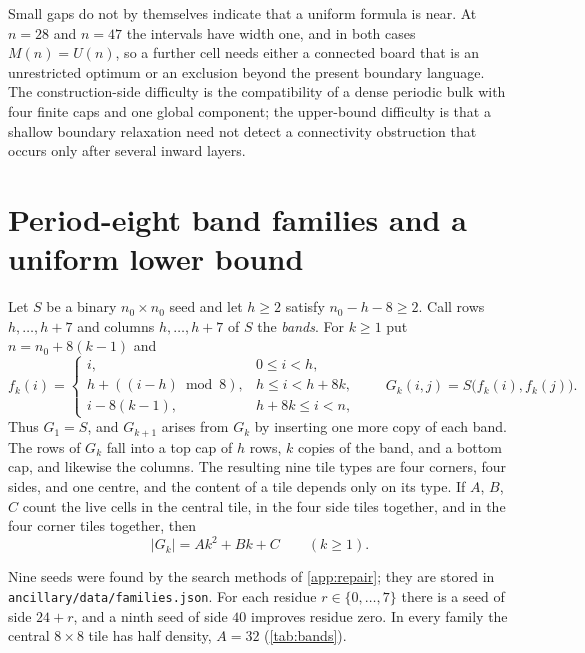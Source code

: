 \documentclass[10pt]{article}
\theoremstyle{remark}
\begin{document}
Small gaps do not by themselves indicate that a uniform formula is near.  At
$n=28$ and $n=47$ the intervals have width one, and in both cases
$M(n)=U(n)$, so a further cell needs either a connected board that is an
unrestricted optimum or an exclusion beyond the present boundary language.  The
construction-side difficulty is the compatibility of a dense periodic bulk with
four finite caps and one global component; the upper-bound difficulty is that a
shallow boundary relaxation need not detect a connectivity obstruction that
occurs only after several inward layers.

\section{Period-eight band families and a uniform lower bound}\label{sec:bands}

Let $S$ be a binary $n_0\times n_0$ seed and let $h\ge2$ satisfy $n_0-h-8\ge2$.
Call rows $h,\ldots,h+7$ and columns $h,\ldots,h+7$ of $S$ the \emph{bands}.  For
$k\ge1$ put $n=n_0+8(k-1)$ and
\begin{equation}\label{eq:band-index}
 f_k(i)=
 \begin{cases}
 i,&0\le i<h,\\
 h+((i-h)\bmod8),&h\le i<h+8k,\\
 i-8(k-1),&h+8k\le i<n,
 \end{cases}
 \qquad
 G_k(i,j)=S\bigl(f_k(i),f_k(j)\bigr).
\end{equation}
Thus $G_1=S$, and $G_{k+1}$ arises from $G_k$ by inserting one more copy of
each band.  The rows of $G_k$ fall into a top cap of $h$ rows, $k$ copies of the
band, and a bottom cap, and likewise the columns.  The resulting nine tile types
are four corners, four sides, and one centre, and the content of a tile depends
only on its type.  If $A$, $B$, $C$ count the live cells in the central tile, in
the four side tiles together, and in the four corner tiles together, then
\begin{equation}\label{eq:band-pop}
 |G_k|=Ak^2+Bk+C\qquad(k\ge1).
\end{equation}

Nine seeds were found by the search methods of \cref{app:repair}; they are
stored in \nolinkurl{ancillary/data/families.json}.  For each residue
$r\in\{0,\ldots,7\}$ there is a seed of side $24+r$, and a ninth seed of side
$40$ improves residue zero.  In every family the central $8\times8$ tile has
half density, $A=32$ (\cref{tab:bands}).

\begin{table}[t]
\centering
\caption{The nine band families: seed side $n_0$, band start $h$, tile counts
$A,B,C$ of \eqref{eq:band-pop}, deficit $a_r=n(n+1)/2-|G_k|$, and the radius $R$
of the connectivity certificate.  The primed row is the ninth family.}
\label{tab:bands}

\end{table}
\end{document}
